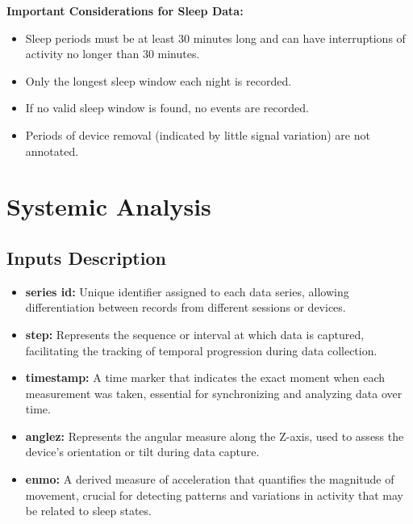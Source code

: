 \documentclass[conference]{IEEEtran}
\begin{document}
\textbf{Important Considerations for Sleep Data:}
\begin{itemize}
    \item Sleep periods must be at least 30 minutes long and can have interruptions of activity no longer than 30 minutes.
    \item Only the longest sleep window each night is recorded.
    \item If no valid sleep window is found, no events are recorded.
    \item Periods of device removal (indicated by little signal variation) are not annotated.
\end{itemize}

\section{Systemic Analysis}
\subsection{Inputs Description}
\begin{itemize}
    \item \textbf{series id:} Unique identifier assigned to each data series, allowing differentiation between records from different sessions or devices.
    \item \textbf{step:} Represents the sequence or interval at which data is captured, facilitating the tracking of temporal progression during data collection.
    \item \textbf{timestamp:} A time marker that indicates the exact moment when each measurement was taken, essential for synchronizing and analyzing data over time.
    \item \textbf{anglez:} Represents the angular measure along the Z-axis, used to assess the device's orientation or tilt during data capture.
    \item \textbf{enmo:} A derived measure of acceleration that quantifies the magnitude of movement, crucial for detecting patterns and variations in activity that may be related to sleep states.
\end{itemize}
\end{document}
